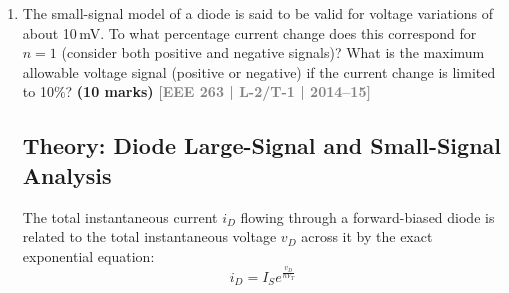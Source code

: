 \documentclass[12pt,a3paper]{article}
\newcommand{\yr}[1]{\hfill\textcolor{gray}{\small\textbf{[#1]}}}
\newcommand{\mk}[1]{\textcolor{orange!70!black}{\small\textbf{(#1 marks)}}}
\begin{document}
\begin{enumerate}
\begin{tcolorbox}[enhanced,breakable,ansbox,colback=cA!4,colframe=cA,boxrule=0.8pt,arc=5pt,title={\textbf{Answer}},fonttitle=\bfseries\color{white},colbacktitle=cA]
\begin{enumerate}
    \item \textbf{When $I = 0.1 \times I_{45}$:} 
    \begin{equation}
        \omega r_d C = \frac{I_{45}}{0.1 I_{45}} = 10
    \end{equation}
    \begin{equation}
        \phi_1 = -\tan^{-1}(10) \approx \mathbf{-84.29^\circ}
    \end{equation}
    
    \item \textbf{When $I = 10 \times I_{45}$:} 
    \begin{equation}
        \omega r_d C = \frac{I_{45}}{10 I_{45}} = 0.1
    \end{equation}
    \begin{equation}
        \phi_2 = -\tan^{-1}(0.1) \approx \mathbf{-5.71^\circ}
    \end{equation}
\end{enumerate}

\textbf{Final Conclusion:} By varying the DC bias current $I$ from 0.1 to 10 times the center $-45^\circ$ condition value, the phase shift can be electronically tuned over a range from \textbf{$-5.71^\circ$ to $-84.29^\circ$}. This highlights the circuit's fundamental utility as a highly tunable current-controlled phase shifter.

\end{tcolorbox}

\item The small-signal model of a diode is said to be valid for voltage variations of about 10\,mV. To what percentage current change does this correspond for $n=1$ (consider both positive and negative signals)? What is the maximum allowable voltage signal (positive or negative) if the current change is limited to 10\%?
\mk{10} \yr{EEE 263 | L-2/T-1 | 2014--15}

\begin{tcolorbox}[enhanced,breakable,ansbox,colback=cA!4,colframe=cA,boxrule=0.8pt,arc=5pt,title={\textbf{Answer}},fonttitle=\bfseries\color{white},colbacktitle=cA]

\subsection*{Theory: Diode Large-Signal and Small-Signal Analysis}

The total instantaneous current $i_D$ flowing through a forward-biased diode is related to the total instantaneous voltage $v_D$ across it by the exact exponential equation:
\begin{equation}
    i_D = I_S e^{\frac{v_D}{n V_T}}
\end{equation}


\end{tcolorbox}
\end{enumerate}
\end{document}
